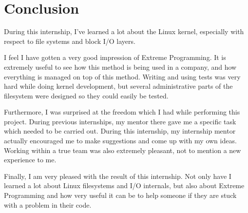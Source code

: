 \chapter{Conclusion}

During this internship, I've learned a lot about the Linux kernel, especially with respect to file systems and block I/O layers.

I feel I have gotten a very good impression of Extreme Programming. It is extremely useful to see how this method is being used in a company, and how everything is managed on top of this method. Writing and using tests was very hard while doing kernel development, but several administrative parts of the filesystem were designed so they could easily be tested.

Furthermore, I was surprised at the freedom which I had while performing this project. During previous internships, my mentor there gave me a specific task which needed to be carried out. During this internship, my internship mentor actually encouraged me to make suggestions and come up with my own ideas. Working within a true team was also extremely pleasant, not to mention a new experience to me.

Finally, I am very pleased with the result of this internship. Not only have I learned a lot about Linux filesystems and I/O internals, but also about Extreme Programming and how very useful it can be to help someone if they are stuck with a problem in their code.
